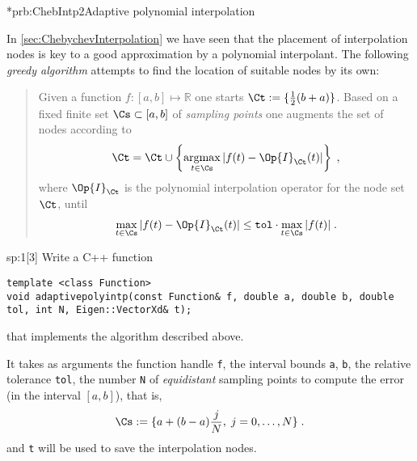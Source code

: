 

\begin{samproblem}*{prb:ChebIntp2}{Adaptive polynomial interpolation}{
  In \cref{sec:ChebychevInterpolation} we have seen that the placement of
  interpolation nodes is key to a good approximation by a polynomial
  interpolant. The following \emph{greedy algorithm} attempts to find the location
  of suitable nodes by its own:
  \begin{quote}
    Given a function $f:[a,b]\mapsto \mathbb{R}$ one starts
    $\Ct:=\{\frac{1}{2}(b+a)\}$. Based on a fixed finite set
    $\Cs\subset[a,b]$ of \emph{sampling points} one augments the set of nodes
    according to
    \begin{gather}\label{rb:1}
      \Ct = \Ct \cup \left\{\operatorname*{argmax}\limits_{t\in\Cs}
      |f(t)-\Op{I}_{\Ct}(t)|\right\}\;,
    \end{gather}
    where $\Op{I}_{\Ct}$ is the polynomial interpolation operator for
    the node set $\Ct$, until 
    \begin{gather}\label{rb:2}
      \operatorname*{max}\limits_{t\in\Cs}
      |f(t)-\Op{I}_{\Ct}(t)| \leq \mathtt{tol}\cdot 
      \operatorname*{max}\limits_{t\in\Cs}
      |f(t)|\;.
    \end{gather}
  \end{quote}
}


\begin{subproblem}{sp:1}[3]
  Write a C++ function 
  \begin{lstlisting}[style=cpp]
template <class Function>
void adaptivepolyintp(const Function& f, double a, double b, double tol, int N, Eigen::VectorXd& t);
  \end{lstlisting}
  that implements the algorithm described above.
  
  It takes as arguments the function handle \texttt{f}, the interval bounds \texttt{a}, \texttt{b}, the
  relative tolerance \texttt{tol}, the number \texttt{N} of \emph{equidistant} sampling points to compute the
  error (in the interval $[a,b]$), that is,
  \begin{gather*}
    \Cs := \{a+(b-a)\frac{j}{N},\;j=0,\ldots,N\}\;.
  \end{gather*}
  and \texttt{t} will be used to save the interpolation nodes.


\end{subproblem}
\end{samproblem}
